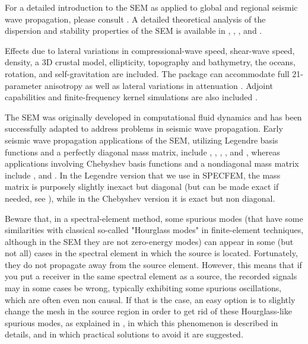 For a detailed introduction to the SEM as applied to
global and regional seismic wave propagation, please consult \citet{TrKoLi08,PeKoLuMaLeCaLeMaLiBlNiBaTr11,KoVi98,KoTr99,Ch00,KoTr02a,KoTr02b,KoRiTr02,ChCaVi03,CaChViMo03,ChVa04,ChKoViCaVaFe07}.
A detailed theoretical analysis of the dispersion
and stability properties of the SEM is available in \citet{Coh02}, \citet{DeSe07}, \citet{SeOl07}, \citet{SeOl08} and \citet{MeStTh12}.\newline


Effects due to lateral variations in compressional-wave
speed, shear-wave speed, density, a 3D crustal model, ellipticity,
topography and bathymetry, the oceans, rotation, and self-gravitation are included.
The package can accommodate full 21-parameter anisotropy \citep{ChTr07}
as well as lateral variations in attenuation \citep{SaKoTr10}. Adjoint
capabilities and finite-frequency kernel simulations are also included
\citep{TrKoLi08,PeKoLuMaLeCaLeMaLiBlNiBaTr11,LiTr06,LiTr08,FiIgBuKe09,ViOp09}.\newline


The SEM was originally developed in computational fluid dynamics \citep{Pat84,MaPa89}
and has been successfully adapted to address problems in seismic wave propagation.
Early seismic wave propagation applications of the SEM, utilizing Legendre basis functions and a
perfectly diagonal mass matrix, include \cite{CoJoTo93}, \cite{Kom97},
\cite{FaMaPaQu97}, \cite{CaGa97}, \cite{KoVi98} and \cite{KoTr99},
whereas applications involving Chebyshev basis functions and a nondiagonal mass matrix
include \cite{SePr94}, \cite{PrCaSe94} and \cite{SePrPr95}.
In the Legendre version that we use in SPECFEM, the mass matrix is purposely slightly inexact but diagonal (but can be made exact if needed, see \cite{Teu15}),
while in the Chebyshev version it is exact but non diagonal.\newline


Beware that, in a spectral-element method, some spurious modes (that have some similarities with classical so-called "Hourglass modes" in finite-element techniques,
although in the SEM they are not zero-energy modes) can appear in some (but not all) cases in the spectral element in which the source is located.
Fortunately, they do not propagate away from the source element.
However, this means that if you put a receiver in the same spectral element as a source, the recorded signals may in some cases be wrong, typically exhibiting some spurious
oscillations, which are often even non causal.
If that is the case, an easy option is to slightly change the mesh in the source region in order to get rid of these Hourglass-like spurious modes,
as explained in \cite{DuLiScGa14}, in which this phenomenon is described in details, and in which practical solutions to avoid it are suggested.\newline


